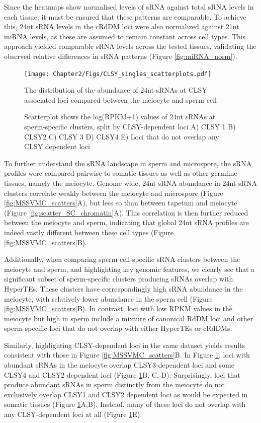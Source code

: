 Since the heatmaps show normalised levels of sRNA against total sRNA levels in each tissue, it must be ensured that these patterns are comparable. To achieve this, 24nt sRNA levels in the cRdDM loci were also normalized against 21nt miRNA levels, as these are assumed to remain constant across cell types. This approach yielded comparable sRNA levels across the tested tissues, validating the observed relative differences in sRNA patterns (Figure \ref{fig:miRNA_norm}).

\begin{figure}[htbp!] 
\centering    
    \texttt{[image: Chapter2/Figs/CLSY\_singles\_scatterplots.pdf]}
\caption{The distribution of the abundance of 24nt sRNAs at CLSY associated loci compared between the meiocyte and sperm cell}
\label{fig:clsysingle_scatters}
\captionsetup{font=small}
    \caption*{Scatterplot shows the log(RPKM+1) values of 24nt sRNAs at sperm-specific clusters, split by CLSY-dependent loci A) CLSY 1 B) CLSY2 C) CLSY 3 D) CLSY4 E) Loci that do not overlap any CLSY dependent loci}
\end{figure}

To further understand the sRNA landscape in sperm and microspore, the sRNA profiles were compared pairwise to somatic tissues as well as other germline tissues, namely the meiocyte. Genome wide, 24nt sRNA abundance in 24nt sRNA clusters correlate weakly between the meiocyte and microspore (Figure \ref{fig:MSSVMC_scatters}A), but less so than between tapetum and meiocyte (Figure \ref{fig:scatter_SC_chromatin}A). This correlation is then further reduced between the meiocyte and sperm, indicating that global 24nt sRNA profiles are indeed vastly different between these cell types (Figure \ref{fig:MSSVMC_scatters}B).

Additionally, when comparing sperm cell-specific sRNA clusters between the meiocyte and sperm, and highlighting key genomic features, we clearly see that a significant subset of sperm-specific clusters producing sRNAs overlap with HyperTEs. These clusters have correspondingly high sRNA abundance in the meiocyte, with relatively lower abundance in the sperm cell (Figure \ref{fig:MSSVMC_scatters}B). In contrast, loci with low RPKM values in the meiocyte but high in sperm include a mixture of canonical RdDM loci and other sperm-specific loci that do not overlap with either HyperTEs or cRdDMs.

Similarly, highlighting CLSY-dependent loci in the same dataset  yields results consistent with those in Figure \ref{fig:MSSVMC_scatters}B. In Figure \ref{fig:clsysingle_scatters}, loci with abundant sRNAs in the meiocyte overlap CLSY3-dependent loci and some CLSY4 and CLSY2 dependent loci (Figure \ref{fig:clsysingle_scatters}B, C, D). Surprisingly, loci that produce abundant sRNAs in sperm distinctly from the meiocyte do not exclusively overlap CLSY1 and CLSY2 dependent loci as would be expected in somatic tissues (Figure \ref{fig:clsysingle_scatters}A,B). Instead, many of these loci do not overlap with any CLSY-dependent loci at all (Figure \ref{fig:clsysingle_scatters}E). 

